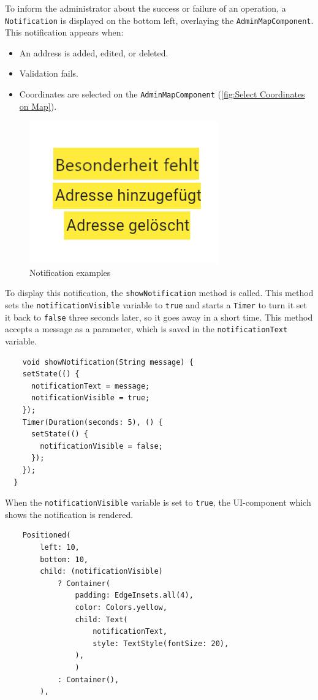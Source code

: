     To inform the administrator about the success or failure of an operation, a \texttt{Notification} is displayed on the bottom left, overlaying the \texttt{AdminMapComponent}. This notification appears when:

    \begin{itemize}
        \item An address is added, edited, or deleted.
        \item Validation fails.
        \item Coordinates are selected on the \texttt{AdminMapComponent} (\ref{fig:Select Coordinates on Map}).
        \end{itemize}


\begin{figure}[H]
    \centering
    \includegraphics[width=0.4\linewidth]{images/AdminPanel/NotificationExamples.png}
    \caption{Notification examples}
\end{figure}

To display this notification, the \texttt{showNotification} method is called. This method sets the \texttt{notificationVisible} variable to \texttt{true} and starts a \texttt{Timer} to turn it set it back to \texttt{false} three seconds later, so it goes away in a short time. This method accepts a message as a parameter, which is saved in the \texttt{notificationText} variable.
\lstset{style=mycsharp, caption=showNotification method}
\begin{lstlisting}
    void showNotification(String message) {
    setState(() {
      notificationText = message;
      notificationVisible = true;
    }); 
    Timer(Duration(seconds: 5), () {
      setState(() {
        notificationVisible = false;
      });
    });
  }
\end{lstlisting}

When the \texttt{notificationVisible} variable is set to \texttt{true}, the UI-component which shows the notification is rendered.
\lstset{style=mycsharp, caption=Notification in AddressPage}
\begin{lstlisting}
    Positioned(
        left: 10,
        bottom: 10,
        child: (notificationVisible)
            ? Container(
                padding: EdgeInsets.all(4),
                color: Colors.yellow,
                child: Text(
                    notificationText,
                    style: TextStyle(fontSize: 20),
                ),
                )
            : Container(),
        ),
\end{lstlisting}

